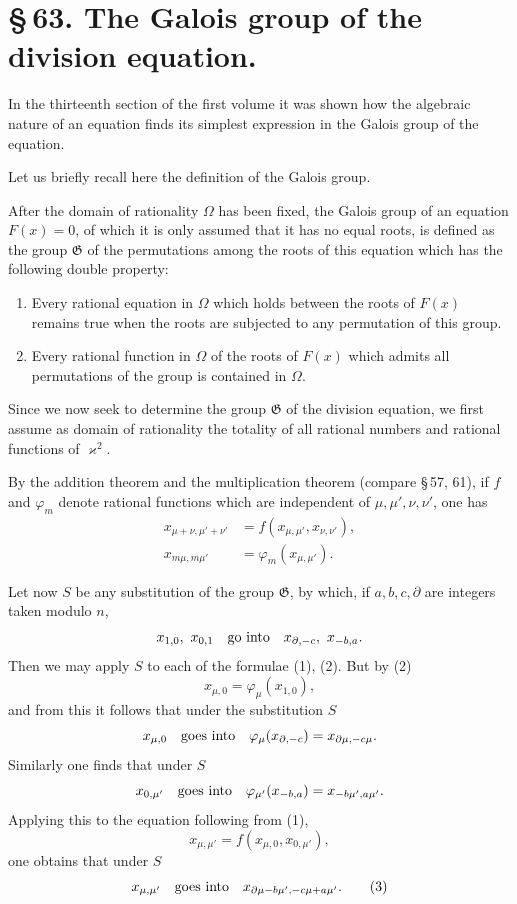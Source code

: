 \documentclass[11pt]{article}
\begin{document}
\section*{\S\,63. The Galois group of the division equation.}

In the thirteenth section of the first volume it was shown how the algebraic nature of an
 equation finds its simplest expression in the Galois group of the equation.

Let us briefly recall here the definition of the Galois group.

After the domain of rationality $\Omega$ has been fixed, the Galois group of an equation
$F(x)=0$, of which it is only assumed that it has no equal roots, is defined as the group
$\mathfrak G$ of the permutations among the roots of this equation which has the following
double property:
\begin{enumerate}[label=\alph*)]
\item Every rational equation in $\Omega$ which holds between the roots of $F(x)$ remains
true when the roots are subjected to any permutation of this group.
\item Every rational function in $\Omega$ of the roots of $F(x)$ which admits all permutations
of the group is contained in $\Omega$.
\end{enumerate}

Since we now seek to determine the group $\mathfrak G$ of the division equation, we first
assume as domain of rationality the totality of all rational numbers and rational functions
of $\varkappa^2$.

By the addition theorem and the multiplication theorem (compare \S\,57, 61), if $f$ and
$\varphi_m$ denote rational functions which are independent of $\mu,\mu',\nu,\nu'$, one has
\begin{align}
 x_{\mu+\nu,\mu'+\nu'}&=f(x_{\mu,\mu'},x_{\nu,\nu'}),\tag{1}\\
 x_{m\mu,m\mu'}&=\varphi_m(x_{\mu,\mu'}).\tag{2}
\end{align}

Let now $S$ be any substitution of the group $\mathfrak G$, by which, if $a,b,c,\partial$ are
integers taken modulo $n$,
\[
 x_{1,0},\ x_{0,1}\quad\hbox{go into}\quad x_{\partial,-c},\ x_{-b,a}.
\]
Then we may apply $S$ to each of the formulae (1), (2). But by (2)
\[
 x_{\mu,0}=\varphi_\mu(x_{1,0}),
\]
and from this it follows that under the substitution $S$
\[
 x_{\mu,0}\quad\hbox{goes into}\quad \varphi_\mu(x_{\partial,-c})=x_{\partial\mu,-c\mu}.
\]
Similarly one finds that under $S$
\[
 x_{0,\mu'}\quad\hbox{goes into}\quad \varphi_{\mu'}(x_{-b,a})=x_{-b\mu',a\mu'}.
\]
Applying this to the equation following from (1),
\[
 x_{\mu,\mu'}=f(x_{\mu,0},x_{0,\mu'}),
\]
one obtains that under $S$
\begin{equation}
 x_{\mu,\mu'}\quad\hbox{goes into}\quad x_{\partial\mu-b\mu',-c\mu+a\mu'}.
\tag{3}
\end{equation}
\end{document}
